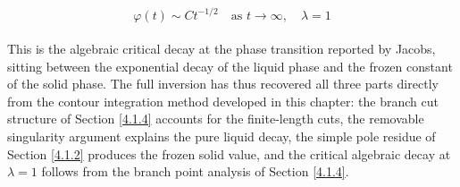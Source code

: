 \begin{equation}
    \varphi(t) \sim Ct^{-1/2} \quad \text{as } t \to \infty, \quad \lambda = 1
\end{equation}
\\
This is the algebraic critical decay at the phase transition reported by Jacobs, 
sitting between the exponential decay of the liquid phase and the frozen constant 
of the solid phase. The full inversion has thus recovered all three parts 
directly from the contour integration method developed in this chapter: the 
branch cut structure of Section \ref{4.1.4} accounts for the finite-length cuts, the 
removable singularity argument explains the pure liquid decay, the simple pole 
residue of Section \ref{4.1.2} produces the frozen solid value, and the critical 
algebraic decay at $\lambda = 1$ follows from the branch point analysis of 
Section \ref{4.1.4}.








